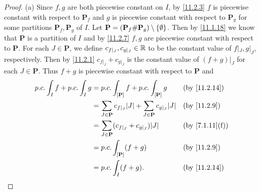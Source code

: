 \begin{proof}{(a)}
  Since \(f, g\) are both piecewise constant on \(I\), by \cref{11.2.3} \(f\) is piecewise constant with respect to \(\mathbf{P}_f\) and \(g\) is piecewise constant with respect to \(\mathbf{P}_g\) for some partitions \(\mathbf{P}_f, \mathbf{P}_g\) of \(I\).
  Let \(\mathbf{P} = (\mathbf{P}_f \# \mathbf{P}_g) \setminus \left\lbrace\emptyset\right\rbrace\).
  Then by \cref{11.1.18} we know that \(\mathbf{P}\) is a partition of \(I\) and by \cref{11.2.7} \(f, g\) are piecewise constant with respect to \(\mathbf{P}\).
  For each \(J \in \mathbf{P}\), we define \(c_{f|_J}, c_{g|_J} \in \mathbb{R}\) to be the constant value of \(f|_J, g|_J\), respectively.
  Then by \cref{11.2.1} \(c_{f|_J} + c_{g|_J}\) is the constant value of \((f + g)|_J\) for each \(J \in \mathbf{P}\).
  Thus \(f + g\) is piecewise constant with respect to \(\mathbf{P}\) and
  \begin{align*}
    p.c. \int_I f + p.c. \int_I g & = p.c. \int_{[\mathbf{P}]} f + p.c. \int_{[\mathbf{P}]} g                             &  & \by{11.2.14}                 \\
                                  & = \sum_{J \in \mathbf{P}} c_{f|_J} \abs{J} + \sum_{J \in \mathbf{P}} c_{g|_J} \abs{J} &  & \by{11.2.9}                  \\
                                  & = \sum_{J \in \mathbf{P}} (c_{f|_J} + c_{g|_J}) \abs{J}                               &  & \text{(by \cref{7.1.11}(f))} \\
                                  & = p.c. \int_{[\mathbf{P}]} (f + g)                                                    &  & \by{11.2.9}                  \\
                                  & = p.c. \int_I (f + g).                                                                &  & \by{11.2.14}
  \end{align*}
\end{proof}

